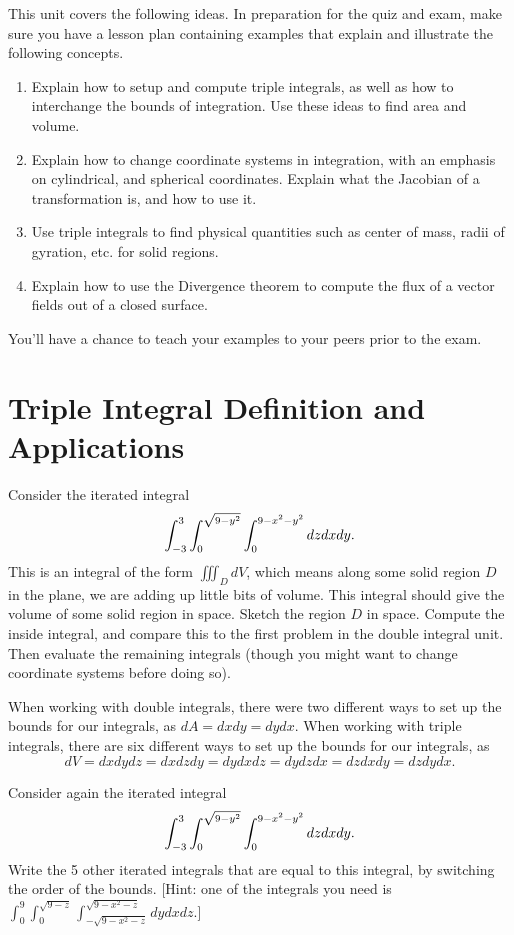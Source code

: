
\noindent 
This unit covers the following ideas. In preparation for the quiz and exam, make sure you have a lesson plan containing examples that explain and illustrate the following concepts.  
\begin{enumerate}
\item Explain how to setup and compute triple integrals, as well as how to interchange the bounds of integration. Use these ideas to find area and volume.
\item Explain how to change coordinate systems in integration, with an emphasis on cylindrical, and spherical coordinates. Explain what the Jacobian of a transformation is, and how to use it.
\item Use triple integrals to find physical quantities such as center of mass, radii of gyration, etc. for solid regions.
\item Explain how to use the Divergence theorem to compute the flux of a vector fields out of a closed surface.
\end{enumerate}
You'll have a chance to teach your examples to your peers prior to the exam.


\section{Triple Integral Definition and Applications}

\begin{problem}
Consider the iterated integral $$\displaystyle \int_{-3}^3 \int_0^{\sqrt{9-y^2}}\int_0^{9-x^2-y^2} dzdxdy.$$ This is an integral of the form $\iiint_D dV$, which means along some solid region $D$ in the plane, we are adding up little bits of volume. This integral should give the volume of some solid region in space.  Sketch the region $D$ in space.  Compute the inside integral, and compare this to the first problem in the double integral unit.  Then evaluate the remaining integrals (though you might want to change coordinate systems before doing so).
\end{problem}

When working with double integrals, there were two different ways to set up the bounds for our integrals, as $dA=dxdy=dydx$.  When working with triple integrals, there are six different ways to set up the bounds for our integrals, as $$dV=dxdydz = dxdzdy = dydxdz=dydzdx=dzdxdy=dzdydx.$$ 

\begin{problem}
Consider again the iterated integral $$\displaystyle \int_{-3}^3 \int_0^{\sqrt{9-y^2}}\int_0^{9-x^2-y^2} dzdxdy.$$ Write the 5 other iterated integrals that are equal to this integral, by switching the order of the bounds. [Hint: one of the integrals you need is $\int_0^9\int_0^{\sqrt{9-z}}\int_{-\sqrt{9-x^2-z}}^{\sqrt{9-x^2-z}} dydxdz$.]
\end{problem}

